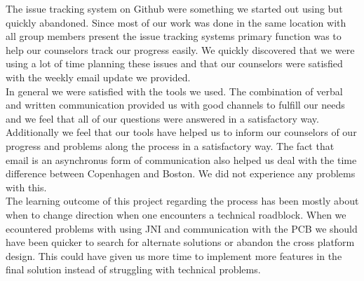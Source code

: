 The issue tracking system on Github were something we started out using but quickly abandoned. Since most of our work was done in the same location with all group members present the issue tracking systems primary function was to help our counselors track our progress easily. We quickly discovered that we were using a lot of time planning these issues and that our counselors were satisfied with the weekly email update we provided. \\

In general we were satisfied with the tools we used. The combination of verbal and written communication provided us with good channels to fulfill our needs and we feel that all of our questions were answered in a satisfactory way. Additionally we feel that our tools have helped us to inform our counselors of our progress and problems along the process in a satisfactory way. The fact that email is an asynchronus form of communication also helped us deal with the time difference between Copenhagen and Boston. We did not experience any problems with this. \\

The learning outcome of this project regarding the process has been mostly about when to change direction when one encounters a technical roadblock. When we ecountered problems with using JNI and communication with the PCB we should have been quicker to search for alternate solutions or abandon the cross platform design. This could have given us more time to implement more features in the final solution instead of struggling with technical problems.
